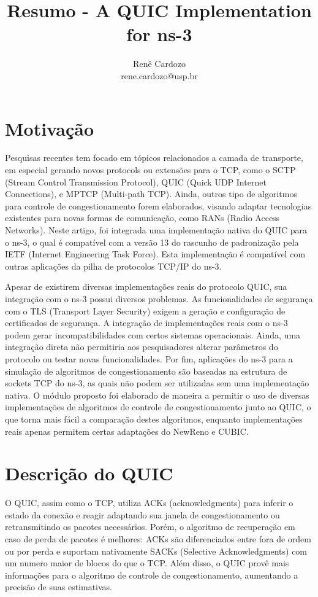 \documentclass{article}
\author{Renê Cardozo \\ 
        rene.cardozo@usp.br}
\title{Resumo - A QUIC Implementation for ns-3}
\date{}
\begin{document}
\maketitle

\section{Motivação}

Pesquisas recentes tem focado em tópicos relacionados a camada de transporte, em especial gerando novos protocols ou
extensões para o TCP, como o SCTP (Stream Control Transmission Protocol), QUIC (Quick UDP Internet Connections), e
MPTCP (Multi-path TCP). Ainda, outros tipo de algoritmos para controle de congestionamento forem elaborados, visando
adaptar tecnologias existentes para novas formas de comunicação, como RANs (Radio Access Networks). Neste artigo, foi
integrada uma implementação nativa do QUIC para o ns-3, o qual é compatível com a versão 13 do rascunho de padronização
pela IETF (Internet Engineering Task Force). Esta implementação é compatível com outras aplicações da pilha de
protocolos TCP/IP do ns-3.

Apesar de existirem diversas implementações reais do protocolo QUIC, sua integração com o ns-3 possui diversos
problemas. As funcionalidades de segurança com o TLS (Transport Layer Security) exigem a geração e configuração de
certificados de segurança. A integração de implementações reais com o ns-3 podem gerar incompatibilidades com certos
sistemas operacionais. Ainda, uma integração direta não permitiria aos pesquisadores alterar parâmetros do protocolo ou
testar novas funcionalidades. Por fim, aplicações do ns-3 para a simulação de algoritmos de congestionamento são
baseadas na estrutura de sockets TCP do ns-3, as quais não podem ser utilizadas sem uma implementação nativa. O módulo
proposto foi elaborado de maneira a permitir o uso de diversas implementações de algoritmos de controle de
congestionamento junto ao QUIC, o que torna mais fácil a comparação destes algoritmos, enquanto implementações reais
apenas permitem certas adaptações do NewReno e CUBIC.

\section{Descrição do QUIC}
O QUIC, assim como o TCP, utiliza ACKs (acknowledgments) para inferir o estado da conexão e reagir adaptando sua janela
de congestionamento ou retransmitindo os pacotes necessários. Porém, o algoritmo de recuperação em caso de perda de
pacotes é melhores: ACKs são diferenciados entre fora de ordem ou por perda e suportam nativamente SACKs (Selective
Acknowledgments) com um numero maior de blocos do que o TCP. Além disso, o QUIC provê mais informações para o algoritmo
de controle de congestionamento, aumentando a precisão de suas estimativas.
\end{document}
